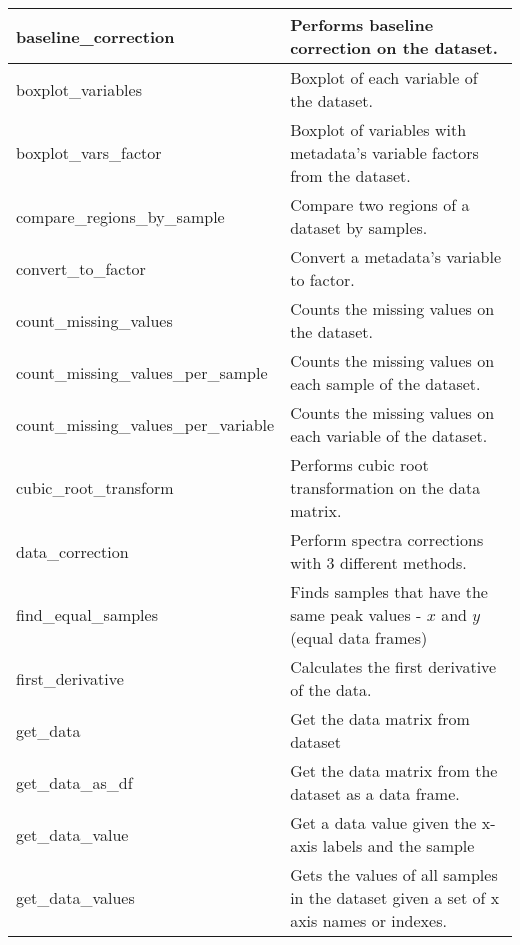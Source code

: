\begin{scriptsize}
\begin{longtable}{|m{4.3cm}|m{11cm}|}
		\hline
		baseline\_correction & Performs baseline correction on the dataset. \\
		
		\hline
		boxplot\_variables & Boxplot of each variable of the dataset. \\
		
		\hline
		boxplot\_vars\_factor & Boxplot of variables with metadata's variable factors from the dataset. \\
		
		\hline
		compare\_regions\_by\_sample & Compare two regions of a dataset by samples. \\
		
		\hline
		convert\_to\_factor & Convert a metadata's variable to factor. \\
		
		\hline
		count\_missing\_values & Counts the missing values on the dataset. \\
		
		\hline
		count\_missing\_values\_per\_sample & Counts the missing values on each sample of the dataset. \\
		
		\hline
		count\_missing\_values\_per\_variable & Counts the missing values on each variable of the dataset. \\
		
		\hline
		cubic\_root\_transform & Performs cubic root transformation on the data matrix. \\
		
		\hline
		data\_correction & Perform spectra corrections with 3 different methods. \\
		
		\hline
		find\_equal\_samples & Finds samples that have the same peak values - $ x $ and $ y $ (equal data frames) \\
		
		\hline
		first\_derivative & Calculates the first derivative of the data. \\
		
		\hline
		get\_data & Get the data matrix from dataset \\
		
		\hline
		get\_data\_as\_df & Get the data matrix from the dataset as a data frame. \\
		
		\hline
		get\_data\_value & Get a data value given the x-axis labels and the sample \\
		
		\hline
		get\_data\_values & Gets the values of all samples in the dataset given a set of x axis names or indexes. \\
		

\end{longtable}
\end{scriptsize}

